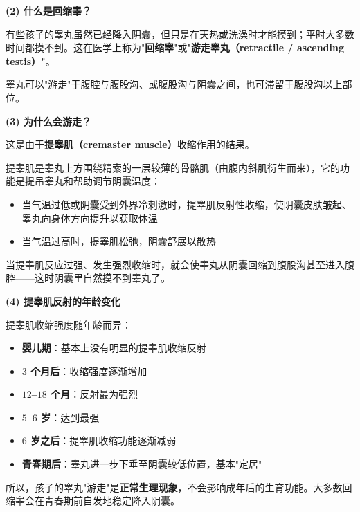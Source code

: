 \vspace{0.3em}
\noindent\textbf{(2) 什么是回缩睾？}

有些孩子的睾丸虽然已经降入阴囊，但只是在天热或洗澡时才能摸到；平时大多数时间都摸不到。这在医学上称为"\textbf{回缩睾}"或"\textbf{游走睾丸（retractile / ascending testis）"}。

睾丸可以"游走"于腹腔与腹股沟、或腹股沟与阴囊之间，也可滞留于腹股沟以上部位。

\vspace{0.3em}
\noindent\textbf{(3) 为什么会游走？}

这是由于\textbf{提睾肌（cremaster muscle）}收缩作用的结果。

提睾肌是睾丸上方围绕精索的一层较薄的骨骼肌（由腹内斜肌衍生而来），它的功能是提吊睾丸和帮助调节阴囊温度：
\begin{itemize}
	\item 当气温过低或阴囊受到外界冷刺激时，提睾肌反射性收缩，使阴囊皮肤皱起、睾丸向身体方向提升以获取体温
	\item 当气温过高时，提睾肌松弛，阴囊舒展以散热
\end{itemize}

当提睾肌反应过强、发生强烈收缩时，就会使睾丸从阴囊回缩到腹股沟甚至进入腹腔——这时阴囊里自然摸不到睾丸了。

\vspace{0.3em}
\noindent\textbf{(4) 提睾肌反射的年龄变化}

提睾肌收缩强度随年龄而异：
\begin{itemize}
	\item \textbf{婴儿期}：基本上没有明显的提睾肌收缩反射
	\item \textbf{$3$ 个月后}：收缩强度逐渐增加
	\item \textbf{$12$--$18$ 个月}：反射最为强烈
	\item \textbf{$5$--$6$ 岁}：达到最强
	\item \textbf{$6$ 岁之后}：提睾肌收缩功能逐渐减弱
	\item \textbf{青春期后}：睾丸进一步下垂至阴囊较低位置，基本"定居"
\end{itemize}

所以，孩子的睾丸"游走"是\textbf{正常生理现象}，不会影响成年后的生育功能。大多数回缩睾会在青春期前自发地稳定降入阴囊。

